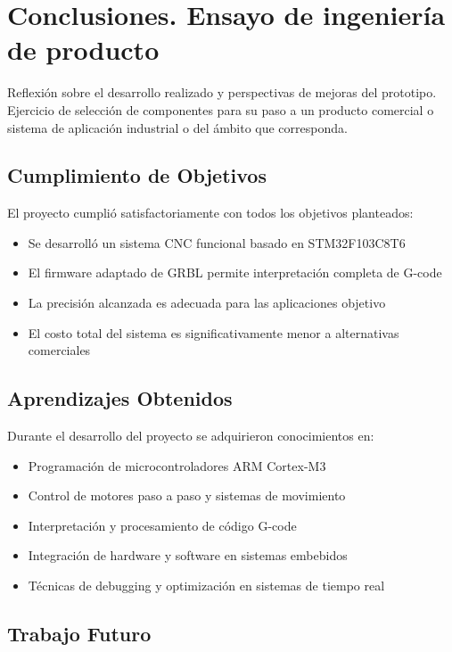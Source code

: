 \documentclass[12pt]{article}
\begin{document}
\section{Conclusiones. Ensayo de ingeniería de producto}
Reflexión sobre el desarrollo realizado y perspectivas de mejoras del prototipo.  
Ejercicio de selección de componentes para su paso a un producto comercial o sistema de aplicación industrial o del ámbito que corresponda.

\subsection{Cumplimiento de Objetivos}

El proyecto cumplió satisfactoriamente con todos los objetivos planteados:

\begin{itemize}
    \item Se desarrolló un sistema CNC funcional basado en STM32F103C8T6
    \item El firmware adaptado de GRBL permite interpretación completa de G-code
    \item La precisión alcanzada es adecuada para las aplicaciones objetivo
    \item El costo total del sistema es significativamente menor a alternativas comerciales
\end{itemize}

\subsection{Aprendizajes Obtenidos}

Durante el desarrollo del proyecto se adquirieron conocimientos en:
\begin{itemize}
    \item Programación de microcontroladores ARM Cortex-M3
    \item Control de motores paso a paso y sistemas de movimiento
    \item Interpretación y procesamiento de código G-code
    \item Integración de hardware y software en sistemas embebidos
    \item Técnicas de debugging y optimización en sistemas de tiempo real
\end{itemize}

\subsection{Trabajo Futuro}
\end{document}
